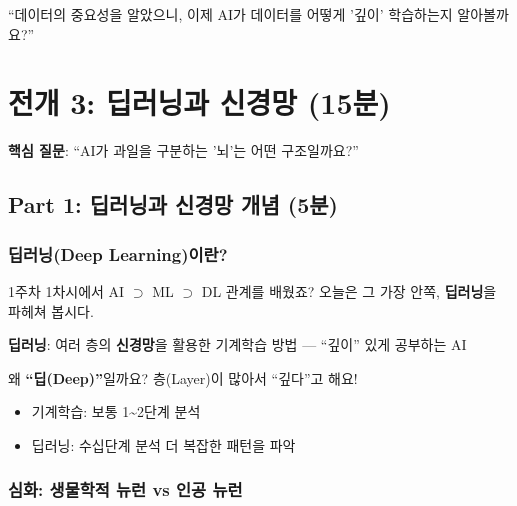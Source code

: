 \documentclass[11pt,a4paper]{article}
\begin{document}
\begin{scriptbox}
``데이터의 중요성을 알았으니, 이제 AI가 데이터를 어떻게 '깊이' 학습하는지 알아볼까요?''
\end{scriptbox}

\newpage

\section{ 전개 3: 딥러닝과 신경망 (15분)}

\begin{questionbox}
 \textbf{핵심 질문}: ``AI가 과일을 구분하는 '뇌'는 어떤 구조일까요?''
\end{questionbox}

\subsection{Part 1: 딥러닝과 신경망 개념 (5분)}

\subsubsection{딥러닝(Deep Learning)이란?}

1주차 1차시에서 AI \(\supset\) ML \(\supset\) DL 관계를 배웠죠? 오늘은 그 가장 안쪽, \textbf{딥러닝}을 파헤쳐 봅시다.

\begin{definitionbox}
\textbf{딥러닝}: 여러 층의 \textbf{신경망}을 활용한 기계학습 방법 --- ``깊이'' 있게 공부하는 AI
\end{definitionbox}

왜 \textbf{``딥(Deep)''}일까요? 층(Layer)이 많아서 ``깊다''고 해요!

\begin{itemize}[nosep]
    \item 기계학습: 보통 1\textasciitilde2단계 분석
    \item 딥러닝: 수십 단계 분석 \textrightarrow{} 더 복잡한 패턴을 파악
\end{itemize}

\subsubsection{ 심화: 생물학적 뉴런 vs 인공 뉴런}
\end{document}
